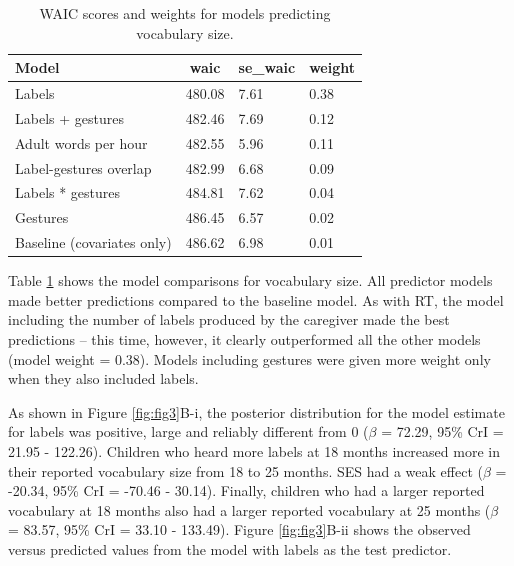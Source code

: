 \documentclass[
  man,floatsintext]{apa6}
\begin{document}
\begin{table}[tbp]

\begin{center}
\begin{threeparttable}

\caption{\label{tab:tab2}WAIC scores and weights for models predicting vocabulary size.}

\begin{tabular}{llll}
\toprule
Model & \multicolumn{1}{c}{waic} & \multicolumn{1}{c}{se\_waic} & \multicolumn{1}{c}{weight}\\
\midrule
Labels & 480.08 & 7.61 & 0.38\\
Labels + gestures & 482.46 & 7.69 & 0.12\\
Adult words per hour & 482.55 & 5.96 & 0.11\\
Label-gestures overlap & 482.99 & 6.68 & 0.09\\
Labels * gestures & 484.81 & 7.62 & 0.04\\
Gestures & 486.45 & 6.57 & 0.02\\
Baseline (covariates only) & 486.62 & 6.98 & 0.01\\
\bottomrule
\end{tabular}

\end{threeparttable}
\end{center}

\end{table}

Table \ref{tab:tab2} shows the model comparisons for vocabulary size. All predictor models made better predictions compared to the baseline model. As with RT, the model including the number of labels produced by the caregiver made the best predictions -- this time, however, it clearly outperformed all the other models (model weight = 0.38). Models including gestures were given more weight only when they also included labels.

As shown in Figure \ref{fig:fig3}B-i, the posterior distribution for the model estimate for labels was positive, large and reliably different from 0 (\(\beta\) = 72.29, 95\% CrI = 21.95 - 122.26). Children who heard more labels at 18 months increased more in their reported vocabulary size from 18 to 25 months. SES had a weak effect (\(\beta\) = -20.34, 95\% CrI = -70.46 - 30.14). Finally, children who had a larger reported vocabulary at 18 months also had a larger reported vocabulary at 25 months (\(\beta\) = 83.57, 95\% CrI = 33.10 - 133.49). Figure \ref{fig:fig3}B-ii shows the observed versus predicted values from the model with labels as the test predictor.
\end{document}
